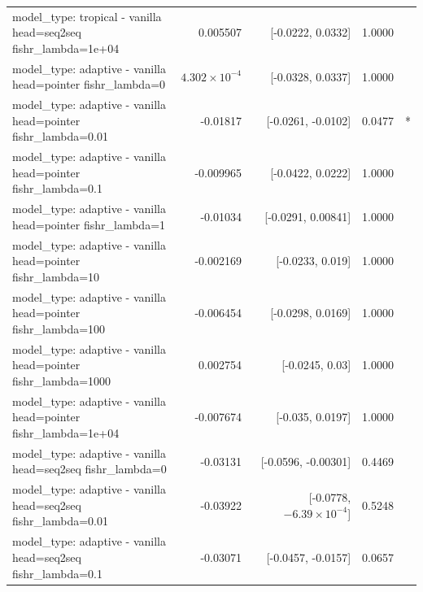 \documentclass[10pt]{article}
\makeatletter
\newcommand{\stackcell}[1]{\begin{tabular}[t]{@{}l@{}}#1\end{tabular}}
\makeatother
\begin{document}
{\begin{longtable}{lrrrl}
\stackcell{model\_type: tropical - vanilla\\\footnotesize head=seq2seq fishr\_lambda=1e+04 } & 0.005507 & [-0.0222, 0.0332] & 1.0000 & \\
\stackcell{model\_type: adaptive - vanilla\\\footnotesize head=pointer fishr\_lambda=0 } & $4.302\times10^{-4}$ & [-0.0328, 0.0337] & 1.0000 & \\
\stackcell{model\_type: adaptive - vanilla\\\footnotesize head=pointer fishr\_lambda=0.01 } & -0.01817 & [-0.0261, -0.0102] & 0.0477 & *\\
\stackcell{model\_type: adaptive - vanilla\\\footnotesize head=pointer fishr\_lambda=0.1 } & -0.009965 & [-0.0422, 0.0222] & 1.0000 & \\
\stackcell{model\_type: adaptive - vanilla\\\footnotesize head=pointer fishr\_lambda=1 } & -0.01034 & [-0.0291, 0.00841] & 1.0000 & \\
\stackcell{model\_type: adaptive - vanilla\\\footnotesize head=pointer fishr\_lambda=10 } & -0.002169 & [-0.0233, 0.019] & 1.0000 & \\
\stackcell{model\_type: adaptive - vanilla\\\footnotesize head=pointer fishr\_lambda=100 } & -0.006454 & [-0.0298, 0.0169] & 1.0000 & \\
\stackcell{model\_type: adaptive - vanilla\\\footnotesize head=pointer fishr\_lambda=1000 } & 0.002754 & [-0.0245, 0.03] & 1.0000 & \\
\stackcell{model\_type: adaptive - vanilla\\\footnotesize head=pointer fishr\_lambda=1e+04 } & -0.007674 & [-0.035, 0.0197] & 1.0000 & \\
\stackcell{model\_type: adaptive - vanilla\\\footnotesize head=seq2seq fishr\_lambda=0 } & -0.03131 & [-0.0596, -0.00301] & 0.4469 & \\
\stackcell{model\_type: adaptive - vanilla\\\footnotesize head=seq2seq fishr\_lambda=0.01 } & -0.03922 & [-0.0778, $-6.39\times10^{-4}$] & 0.5248 & \\
\stackcell{model\_type: adaptive - vanilla\\\footnotesize head=seq2seq fishr\_lambda=0.1 } & -0.03071 & [-0.0457, -0.0157] & 0.0657 & \\

\end{longtable}}
\end{document}
